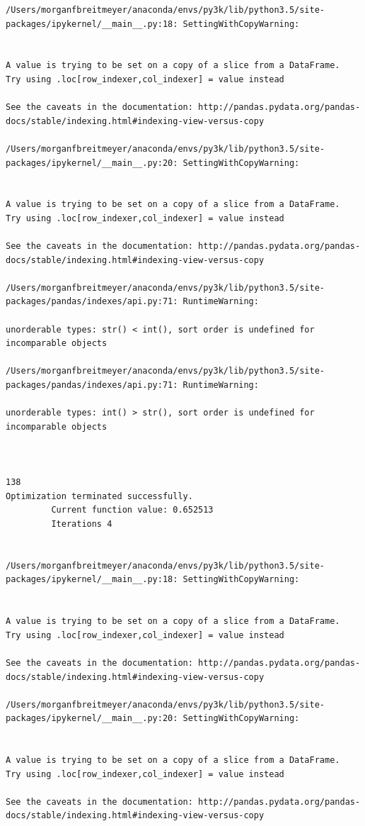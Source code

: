 \begin{lstlisting}
/Users/morganfbreitmeyer/anaconda/envs/py3k/lib/python3.5/site-packages/ipykernel/__main__.py:18: SettingWithCopyWarning:


A value is trying to be set on a copy of a slice from a DataFrame.
Try using .loc[row_indexer,col_indexer] = value instead

See the caveats in the documentation: http://pandas.pydata.org/pandas-docs/stable/indexing.html#indexing-view-versus-copy

/Users/morganfbreitmeyer/anaconda/envs/py3k/lib/python3.5/site-packages/ipykernel/__main__.py:20: SettingWithCopyWarning:


A value is trying to be set on a copy of a slice from a DataFrame.
Try using .loc[row_indexer,col_indexer] = value instead

See the caveats in the documentation: http://pandas.pydata.org/pandas-docs/stable/indexing.html#indexing-view-versus-copy

/Users/morganfbreitmeyer/anaconda/envs/py3k/lib/python3.5/site-packages/pandas/indexes/api.py:71: RuntimeWarning:

unorderable types: str() < int(), sort order is undefined for incomparable objects

/Users/morganfbreitmeyer/anaconda/envs/py3k/lib/python3.5/site-packages/pandas/indexes/api.py:71: RuntimeWarning:

unorderable types: int() > str(), sort order is undefined for incomparable objects



138
Optimization terminated successfully.
         Current function value: 0.652513
         Iterations 4


/Users/morganfbreitmeyer/anaconda/envs/py3k/lib/python3.5/site-packages/ipykernel/__main__.py:18: SettingWithCopyWarning:


A value is trying to be set on a copy of a slice from a DataFrame.
Try using .loc[row_indexer,col_indexer] = value instead

See the caveats in the documentation: http://pandas.pydata.org/pandas-docs/stable/indexing.html#indexing-view-versus-copy

/Users/morganfbreitmeyer/anaconda/envs/py3k/lib/python3.5/site-packages/ipykernel/__main__.py:20: SettingWithCopyWarning:


A value is trying to be set on a copy of a slice from a DataFrame.
Try using .loc[row_indexer,col_indexer] = value instead

See the caveats in the documentation: http://pandas.pydata.org/pandas-docs/stable/indexing.html#indexing-view-versus-copy


\end{lstlisting}
